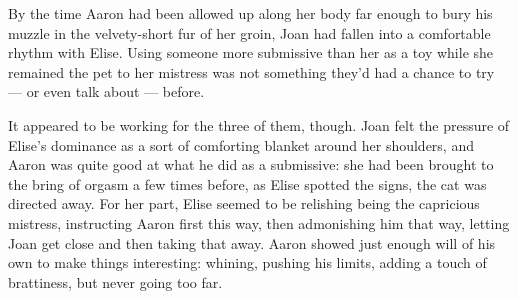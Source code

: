 By the time Aaron had been allowed up along her body far enough to bury
his muzzle in the velvety-short fur of her groin, Joan had fallen into a
comfortable rhythm with Elise. Using someone more submissive than her as
a toy while she remained the pet to her mistress was not something
they'd had a chance to try --- or even talk about --- before.

It appeared to be working for the three of them, though. Joan felt the
pressure of Elise's dominance as a sort of comforting blanket around her
shoulders, and Aaron was quite good at what he did as a submissive: she
had been brought to the bring of orgasm a few times before, as Elise
spotted the signs, the cat was directed away. For her part, Elise seemed
to be relishing being the capricious mistress, instructing Aaron first
this way, then admonishing him that way, letting Joan get close and then
taking that away. Aaron showed just enough will of his own to make
things interesting: whining, pushing his limits, adding a touch of
brattiness, but never going too far.
